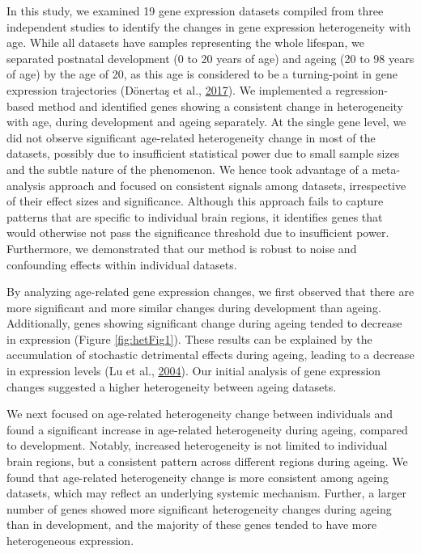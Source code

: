 \documentclass[12pt,twoside]{unicam}
\begin{document}
In this study, we examined 19 gene expression datasets compiled from three independent studies to identify the changes in gene expression heterogeneity with age. While all datasets have samples representing the whole lifespan, we separated postnatal development (0 to 20 years of age) and ageing (20 to 98 years of age) by the age of 20, as this age is considered to be a turning-point in gene expression trajectories (Dönertaş et al., \protect\hyperlink{ref-Donertas2017}{2017}). We implemented a regression-based method and identified genes showing a consistent change in heterogeneity with age, during development and ageing separately. At the single gene level, we did not observe significant age-related heterogeneity change in most of the datasets, possibly due to insufficient statistical power due to small sample sizes and the subtle nature of the phenomenon. We hence took advantage of a meta-analysis approach and focused on consistent signals among datasets, irrespective of their effect sizes and significance. Although this approach fails to capture patterns that are specific to individual brain regions, it identifies genes that would otherwise not pass the significance threshold due to insufficient power. Furthermore, we demonstrated that our method is robust to noise and confounding effects within individual datasets.

By analyzing age-related gene expression changes, we first observed that there are more significant and more similar changes during development than ageing. Additionally, genes showing significant change during ageing tended to decrease in expression (Figure \ref{fig:hetFig1}). These results can be explained by the accumulation of stochastic detrimental effects during ageing, leading to a decrease in expression levels (Lu et al., \protect\hyperlink{ref-Lu2004}{2004}). Our initial analysis of gene expression changes suggested a higher heterogeneity between ageing datasets.

We next focused on age-related heterogeneity change between individuals and found a significant increase in age-related heterogeneity during ageing, compared to development. Notably, increased heterogeneity is not limited to individual brain regions, but a consistent pattern across different regions during ageing. We found that age-related heterogeneity change is more consistent among ageing datasets, which may reflect an underlying systemic mechanism. Further, a larger number of genes showed more significant heterogeneity changes during ageing than in development, and the majority of these genes tended to have more heterogeneous expression.
\end{document}
